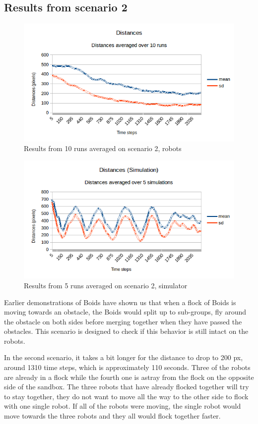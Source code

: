 \subsection{Results from scenario 2}
\label{sec:res2}
\begin{figure}[h]
\begin{center}
\includegraphics[width=0.8\linewidth]{figs/runs/2pdist}
\end{center}
\caption[2. Distances, robots]{Results from 10 runs averaged on scenario 2, robots}
\label{fig:res2pdist}
\end{figure}
\begin{figure}[h]
\begin{center}
\includegraphics[width=0.8\linewidth]{figs/runs/2sdist}
\end{center}
\caption[2. Distances, simulation]{Results from 5 runs averaged on scenario 2, simulator}
\label{fig:res2sdist}
\end{figure}
Earlier demonstrations of Boids have shown us that when a flock of Boids is moving towards an obstacle, the Boids would split up to sub-groups, fly around the obstacle on both sides before merging together when they have passed the obstacles. This scenario is designed to check if this behavior is still intact on the robots.

In the second scenario, it takes a bit longer for the distance to drop to 200 px, around 1310 time steps, which is approximately 110 seconds.
Three of the robots are already in a flock while the fourth one is astray from the flock on the opposite side of the sandbox. The three robots that have already flocked together will try to stay together, they do not want to move all the way to the other side to flock with one single robot. If all of the robots were moving, the single robot would move towards the three robots and they all would flock together faster.

